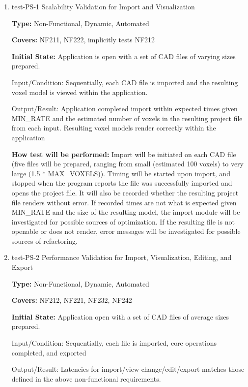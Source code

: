 \documentclass[12pt, titlepage]{article}
\begin{document}
\begin{enumerate}

\item{test-PS-1 Scalability Validation for Import and Visualization\\}

\textbf{Type:} Non-Functional, Dynamic, Automated

\textbf{Covers:} NF211, NF222, implicitly tests NF212
					
\textbf{Initial State:} Application is open with a set of CAD files of varying sizes prepared.
					
Input/Condition: Sequentially, each CAD file is imported and the resulting voxel model is viewed within the application. 
					
Output/Result: Application completed import within expected times given MIN\_RATE and the estimated number of voxels in the resulting project
file from each input. Resulting voxel models render correctly within the application
					
\textbf{How test will be performed:} Import will be initiated on each CAD file (five files will be prepared, ranging from small (estimated 
100 voxels) to very large (1.5 * MAX\_VOXELS)). Timing will be started upon import, and stopped when the program reports the file was 
successfully imported and opens the project file. It will also be recorded whether the resulting project file renders without error.
If recorded times are not what is expected given MIN\_RATE and the size of the
resulting model, the import module will be investigated for possible sources of optimization. If the resulting file is not openable or does
not render, error messages will be investigated for possible sources of refactoring. %
					
\item{test-PS-2 Performance Validation for Import, Visualization, Editing, and Export\\}

\textbf{Type:} Non-Functional, Dynamic, Automated

\textbf{Covers:} NF212, NF221, NF232, NF242
					
\textbf{Initial State:} Application open with a set of CAD files of average sizes prepared.
					
Input/Condition: Sequentially, each file is imported, core operations completed, and exported
					
Output/Result: Latencies for import/view change/edit/export matches those defined in the above non-functional requirements.
					

\end{enumerate}
\end{document}
